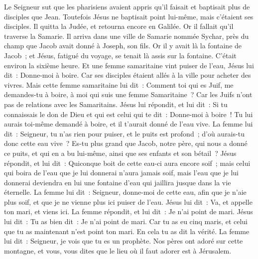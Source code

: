 \begin{multicols}{2}
\VerseOne{}Le Seigneur sut que les pharisiens avaient appris qu'il faisait et baptisait plus de disciples que Jean.
Toutefois Jésus ne baptisait point lui-même, mais c'étaient ses disciples.
Il quitta la Judée, et retourna encore en Galilée.
Or il fallait qu'il traverse la Samarie.
Il arriva dans une ville de Samarie nommée Sychar, près du champ que Jacob avait donné à Joseph, son fils.
Or il y avait là la fontaine de Jacob~; et Jésus, fatigué du voyage, se tenait là assis sur la fontaine. C'était environ la sixième heure.
Et une femme samaritaine vint puiser de l'eau, Jésus lui dit~: Donne-moi à boire.
Car ses disciples étaient allés à la ville pour acheter des vivres.
Mais cette femme samaritaine lui dit~: Comment toi qui es Juif, me demandes-tu à boire, à moi qui suis une femme Samaritaine~? Car les Juifs n'ont pas de relations avec les Samaritains.
Jésus lui répondit, et lui dit~: Si tu connaissais le don de Dieu et qui est celui qui te dit~: Donne-moi à boire~! Tu lui aurais toi-même demandé à boire, et il t'aurait donné de l'eau vive.
La femme lui dit~: Seigneur, tu n'as rien pour puiser, et le puits est profond~; d'où aurais-tu donc cette eau vive~?
Es-tu plus grand que Jacob, notre père, qui nous a donné ce puits, et qui en a bu lui-même, ainsi que ses enfants et son bétail~?
Jésus répondit, et lui dit~: Quiconque boit de cette eau-ci aura encore soif~;
mais celui qui boira de l'eau que je lui donnerai n'aura jamais soif, mais l'eau que je lui donnerai deviendra en lui une fontaine d'eau qui jaillira jusque dans la vie éternelle.
La femme lui dit~: Seigneur, donne-moi de cette eau, afin que je n'aie plus soif, et que je ne vienne plus ici puiser de l'eau.
Jésus lui dit~: Va, et appelle ton mari, et viens ici.
La femme répondit, et lui dit~: Je n'ai point de mari. Jésus lui dit~: Tu as bien dit~: Je n'ai point de mari.
Car tu as eu cinq maris, et celui que tu as maintenant n'est point ton mari. En cela tu as dit la vérité.
La femme lui dit~: Seigneur, je vois que tu es un prophète.
Nos pères ont adoré sur cette montagne, et vous, vous dites que le lieu où il faut adorer est à Jérusalem.

\end{multicols}
